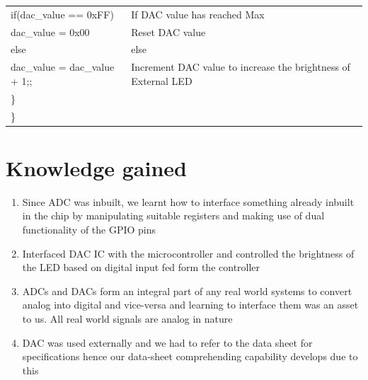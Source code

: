 \documentclass[12pt, letterpaper]{article}
\begin{document}
\begin{longtable}{|p{8cm}||p{6cm}|}
      
      \hspace{0.3cm} if(dac\_value == 0xFF) & If DAC value has reached Max\\
        \hspace{0.5cm}     dac\_value = 0x00 & Reset DAC value\\ 
        \hspace{0.3cm} else & else\\
        \hspace{0.5cm}    dac\_value = dac\_value + 1;; & Increment DAC value to increase the brightness of External LED\\
        \hspace{0.1cm} \} & \\

            \} & \\

\end{longtable}


\newpage

\section{Knowledge gained}

\begin{enumerate}
	\item Since ADC was inbuilt, we learnt how to interface something already inbuilt in the chip by manipulating suitable registers and making use of dual functionality of the GPIO pins
	
	\item Interfaced DAC IC with the microcontroller and controlled the brightness of the LED based on digital input fed form the controller 
	
	\item ADCs and DACs form an integral part of any real world systems to convert analog into digital and vice-versa and learning to interface them was an asset to us. All real world signals are analog in nature
	
	\item DAC was used externally and we had to refer to the data sheet for specifications hence our data-sheet comprehending capability develops due to this
\end{enumerate}
\end{document}
